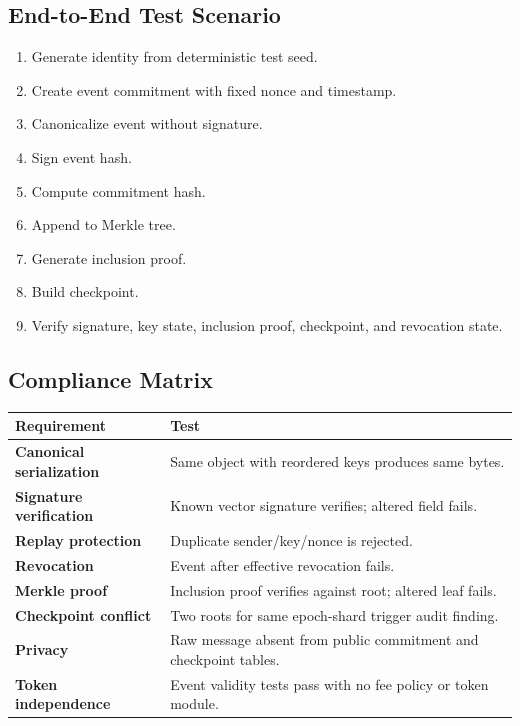 \documentclass[11pt]{article}
\begin{document}
\subsection{End-to-End Test Scenario}

\begin{enumerate}
    \item Generate identity from deterministic test seed.
    \item Create event commitment with fixed nonce and timestamp.
    \item Canonicalize event without signature.
    \item Sign event hash.
    \item Compute commitment hash.
    \item Append to Merkle tree.
    \item Generate inclusion proof.
    \item Build checkpoint.
    \item Verify signature, key state, inclusion proof, checkpoint, and revocation state.
\end{enumerate}

\subsection{Compliance Matrix}

\begin{center}
\begin{tabularx}{\textwidth}{>{\bfseries}p{} X}
\toprule
Requirement & Test \\
\midrule
Canonical serialization & Same object with reordered keys produces same bytes. \\
Signature verification & Known vector signature verifies; altered field fails. \\
Replay protection & Duplicate sender/key/nonce is rejected. \\
Revocation & Event after effective revocation fails. \\
Merkle proof & Inclusion proof verifies against root; altered leaf fails. \\
Checkpoint conflict & Two roots for same epoch-shard trigger audit finding. \\
Privacy & Raw message absent from public commitment and checkpoint tables. \\
Token independence & Event validity tests pass with no fee policy or token module. \\
\bottomrule
\end{tabularx}
\end{center}
\end{document}
